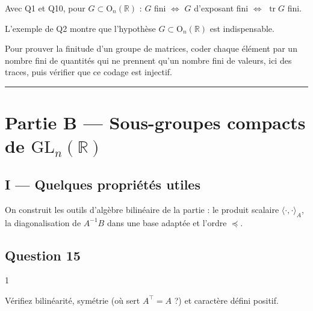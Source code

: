 \documentclass[11pt,a4paper]{article}
\begin{document}
Avec Q1 et Q10, pour \(G\subset{\mathrm{O}}_n(\mathbb{R})\) : \(G\) fini \(\iff\) \(G\) d'exposant fini \(\iff\) \(\operatorname{tr}G\) fini.

L'exemple de Q2 montre que l'hypothèse \(G\subset{\mathrm{O}}_n(\mathbb{R})\) est indispensable.

\begin{methode}

Pour prouver la finitude d'un groupe de matrices, coder chaque élément par un nombre fini de quantités qui ne prennent qu'un nombre fini de valeurs, ici des traces, puis vérifier que ce codage est injectif.

\end{methode}

\begin{center}\rule{0.5\linewidth}{0.5pt}\end{center}

\hypertarget{partie-b-sous-groupes-compacts-de-mathrmgl_nmathbbr}{%
\section{\texorpdfstring{Partie B --- Sous-groupes compacts de \({\mathrm{GL}}_n(\mathbb{R})\)}{Partie B --- Sous-groupes compacts de \{\textbackslash mathrm\{GL\}\}\_n(\textbackslash mathbb\{R\})}}\label{partie-b-sous-groupes-compacts-de-mathrmgl_nmathbbr}}

\hypertarget{i-quelques-propriuxe9tuxe9s-utiles}{%
\subsection{I --- Quelques propriétés utiles}\label{i-quelques-propriuxe9tuxe9s-utiles}}

On construit les outils d'algèbre bilinéaire de la partie : le produit scalaire \(\langle\cdot,\cdot\rangle_A\), la diagonalisation de \(A^{-1}B\) dans une base adaptée et l'ordre \(\preccurlyeq\).

\hypertarget{question-15}{%
\subsection{Question 15}\label{question-15}}

\begin{indication}{1}

Vérifiez bilinéarité, symétrie (où sert \(A^\top=A\) ?) et caractère défini positif.

\end{indication}
\end{document}
